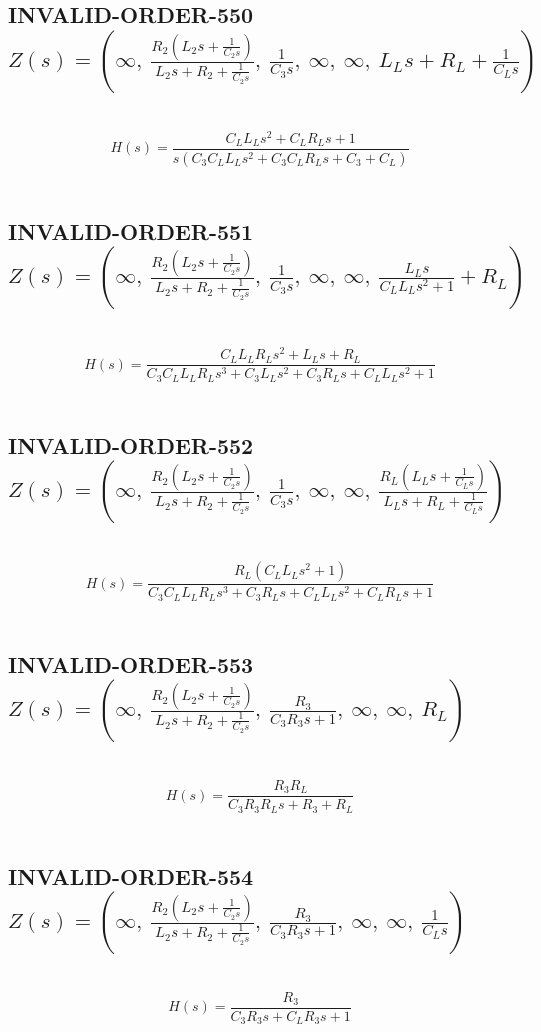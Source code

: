 \documentclass{article}
\begin{document}
\subsection{INVALID-ORDER-550 $Z(s) = \left( \infty, \  \frac{R_{2} \left(L_{2} s + \frac{1}{C_{2} s}\right)}{L_{2} s + R_{2} + \frac{1}{C_{2} s}}, \  \frac{1}{C_{3} s}, \  \infty, \  \infty, \  L_{L} s + R_{L} + \frac{1}{C_{L} s}\right)$ } \ 
\textbf{\[H(s) = \frac{C_{L} L_{L} s^{2} + C_{L} R_{L} s + 1}{s \left(C_{3} C_{L} L_{L} s^{2} + C_{3} C_{L} R_{L} s + C_{3} + C_{L}\right)}\] } \ 
\subsection{INVALID-ORDER-551 $Z(s) = \left( \infty, \  \frac{R_{2} \left(L_{2} s + \frac{1}{C_{2} s}\right)}{L_{2} s + R_{2} + \frac{1}{C_{2} s}}, \  \frac{1}{C_{3} s}, \  \infty, \  \infty, \  \frac{L_{L} s}{C_{L} L_{L} s^{2} + 1} + R_{L}\right)$ } \ 
\textbf{\[H(s) = \frac{C_{L} L_{L} R_{L} s^{2} + L_{L} s + R_{L}}{C_{3} C_{L} L_{L} R_{L} s^{3} + C_{3} L_{L} s^{2} + C_{3} R_{L} s + C_{L} L_{L} s^{2} + 1}\] } \ 
\subsection{INVALID-ORDER-552 $Z(s) = \left( \infty, \  \frac{R_{2} \left(L_{2} s + \frac{1}{C_{2} s}\right)}{L_{2} s + R_{2} + \frac{1}{C_{2} s}}, \  \frac{1}{C_{3} s}, \  \infty, \  \infty, \  \frac{R_{L} \left(L_{L} s + \frac{1}{C_{L} s}\right)}{L_{L} s + R_{L} + \frac{1}{C_{L} s}}\right)$ } \ 
\textbf{\[H(s) = \frac{R_{L} \left(C_{L} L_{L} s^{2} + 1\right)}{C_{3} C_{L} L_{L} R_{L} s^{3} + C_{3} R_{L} s + C_{L} L_{L} s^{2} + C_{L} R_{L} s + 1}\] } \ 
\subsection{INVALID-ORDER-553 $Z(s) = \left( \infty, \  \frac{R_{2} \left(L_{2} s + \frac{1}{C_{2} s}\right)}{L_{2} s + R_{2} + \frac{1}{C_{2} s}}, \  \frac{R_{3}}{C_{3} R_{3} s + 1}, \  \infty, \  \infty, \  R_{L}\right)$ } \ 
\textbf{\[H(s) = \frac{R_{3} R_{L}}{C_{3} R_{3} R_{L} s + R_{3} + R_{L}}\] } \ 
\subsection{INVALID-ORDER-554 $Z(s) = \left( \infty, \  \frac{R_{2} \left(L_{2} s + \frac{1}{C_{2} s}\right)}{L_{2} s + R_{2} + \frac{1}{C_{2} s}}, \  \frac{R_{3}}{C_{3} R_{3} s + 1}, \  \infty, \  \infty, \  \frac{1}{C_{L} s}\right)$ } \ 
\textbf{\[H(s) = \frac{R_{3}}{C_{3} R_{3} s + C_{L} R_{3} s + 1}\] } \ 
\end{document}
